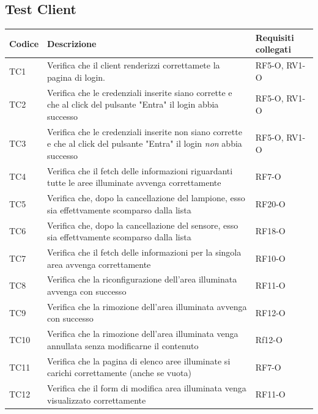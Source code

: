 \documentclass[a4paper, 12pt]{article}
\begin{document}
\subsection*{Test Client}
\setlength\tabcolsep{4pt}
\begin{center}
	\begin{tabularx}{\textwidth}{|X|X|X|}
	\hline
		\textbf{Codice} & \textbf{Descrizione } & \textbf{Requisiti collegati } \\
		\hline
		TC1 &   Verifica che il client renderizzi correttamete la pagina di login.  &    RF5-O, RV1-O                   \\
		\hline
		TC2 &   Verifica che le credenziali inserite siano corrette e che al click del pulsante "Entra" il login abbia successo   &     RF5-O, RV1-O                   \\
		\hline
		TC3 & Verifica che le credenziali inserite non siano corrette e che al click del pulsante "Entra" il login \textit{non} abbia successo & RF5-O, RV1-O \\
		\hline
		TC4 &  Verifica che il fetch delle informazioni riguardanti tutte le aree illuminate avvenga correttamente & RF7-O \\
		\hline
		TC5 &  Verifica che, dopo la cancellazione del lampione, esso sia effettvamente scomparso dalla lista & RF20-O \\
		\hline
		TC6 & Verifica che, dopo la cancellazione del sensore, esso sia effettvamente scomparso dalla lista & RF18-O \\
		\hline
		TC7 & Verifica che il fetch delle informazioni per la singola area avvenga correttamente & RF10-O \\
		\hline
		TC8 & Verifica che la riconfigurazione dell'area illuminata avvenga con successo & RF11-O \\
		\hline
		TC9 & Verifica che la rimozione dell'area illuminata avvenga con successo & RF12-O \\
		\hline
		TC10 & Verifica che la rimozione dell'area illuminata venga annullata senza modificarne il contenuto & Rf12-O \\
		\hline
		TC11 & Verifica che la pagina di elenco aree illuminate si carichi correttamente (anche se vuota) & RF7-O \\
		\hline
		TC12 & Verifica che il form di modifica area illuminata venga visualizzato correttamente & RF11-O \\
		\hline
	\end{tabularx}\\[8pt]
	\mbox{}\\
\end{center}
\end{document}
